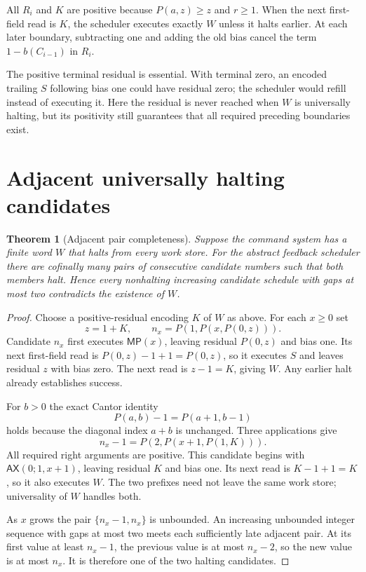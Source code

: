 \documentclass[11pt]{article}
\newcommand{\MP}{\mathsf{MP}}
\newcommand{\AX}{\mathsf{AX}}
\newtheorem{theorem}{Theorem}
\begin{document}
All $R_i$ and $K$ are positive because $P(a,z)\ge z$ and $r\ge1$. When the next first-field read is $K$, the scheduler executes exactly $W$ unless it halts earlier. At each later boundary, subtracting one and adding the old bias cancel the term $1-b(C_{i-1})$ in $R_i$.

The positive terminal residual is essential. With terminal zero, an encoded trailing $S$ following bias one could have residual zero; the scheduler would refill instead of executing it. Here the residual is never reached when $W$ is universally halting, but its positivity still guarantees that all required preceding boundaries exist.

\section{Adjacent universally halting candidates}
\begin{theorem}[Adjacent pair completeness]
Suppose the command system has a finite word $W$ that halts from every work store. For the abstract feedback scheduler there are cofinally many pairs of consecutive candidate numbers such that both members halt. Hence every nonhalting increasing candidate schedule with gaps at most two contradicts the existence of $W$.
\end{theorem}
\begin{proof}
Choose a positive-residual encoding $K$ of $W$ as above. For each $x\ge0$ set
\[
 z=1+K,\qquad n_x=P(1,P(x,P(0,z))).
\]
Candidate $n_x$ first executes $\MP(x)$, leaving residual $P(0,z)$ and bias one. Its next first-field read is $P(0,z)-1+1=P(0,z)$, so it executes $S$ and leaves residual $z$ with bias zero. The next read is $z-1=K$, giving $W$. Any earlier halt already establishes success.

For $b>0$ the exact Cantor identity
\[
 P(a,b)-1=P(a+1,b-1)
\]
holds because the diagonal index $a+b$ is unchanged. Three applications give
\[
 n_x-1=P(2,P(x+1,P(1,K))).
\]
All required right arguments are positive. This candidate begins with $\AX(0;1,x+1)$, leaving residual $K$ and bias one. Its next read is $K-1+1=K$, so it also executes $W$. The two prefixes need not leave the same work store; universality of $W$ handles both.

As $x$ grows the pair $\{n_x-1,n_x\}$ is unbounded. An increasing unbounded integer sequence with gaps at most two meets each sufficiently late adjacent pair. At its first value at least $n_x-1$, the previous value is at most $n_x-2$, so the new value is at most $n_x$. It is therefore one of the two halting candidates.
\end{proof}
\end{document}
